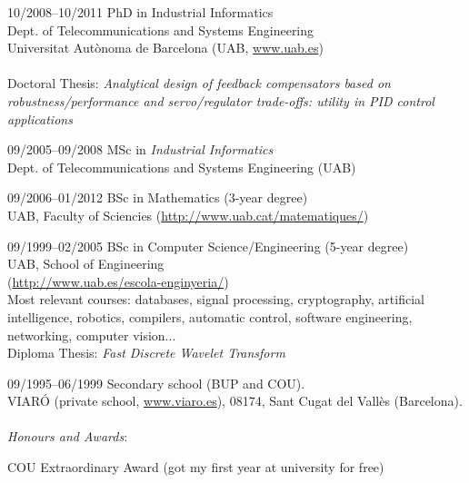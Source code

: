 \documentclass[a4paper]{article}
\begin{document}
\begin{CV}

\item[10/2008--10/2011] PhD in Industrial Informatics\\
Dept. of Telecommunications and Systems Engineering \\
Universitat Autònoma de Barcelona (UAB, \url{www.uab.es}) \\
\\
Doctoral Thesis: \emph{Analytical design of feedback compensators based on robustness/performance and servo/regulator trade-offs: \small{utility in PID control applications}}\\

\item[09/2005--09/2008] MSc in \emph{Industrial Informatics}\\
Dept. of Telecommunications and Systems Engineering (UAB)\\

\item[09/2006--01/2012] BSc in Mathematics (3-year degree)\\
UAB, Faculty of Sciencies (\url{http://www.uab.cat/matematiques/})\\

\item[09/1999--02/2005] BSc in Computer Science/Engineering (5-year degree)\\
UAB, School of Engineering\\ (\url{http://www.uab.es/escola-enginyeria/})
\\Most relevant courses: databases, signal processing,
cryptography, artificial intelligence, robotics, compilers,
automatic control, software engineering, networking, computer vision...
\vspace{0.2cm}
\\Diploma Thesis: \emph{Fast Discrete Wavelet Transform}
\\

\item[09/1995--06/1999] Secondary school (BUP and COU).\\ 
VIARÓ (private school, \url{www.viaro.es}), 08174, Sant Cugat del Vallès (Barcelona).\\
\\
\hspace{0.2cm} \emph{Honours and Awards}: \hspace{0.2cm}

\begin{CV}
\item[COU] Extraordinary Award (got my first year at university for free)\\
\end{CV}
\end{CV}
\end{document}
